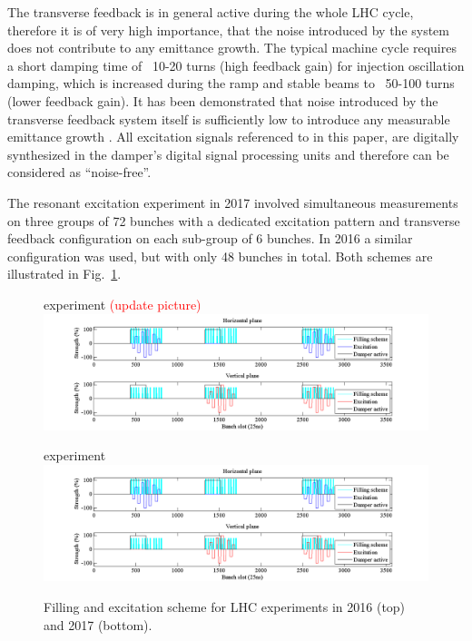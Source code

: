 \documentclass[%
 reprint,
 amsmath,amssymb,
 aps,
prstab,
]{revtex4-1}
\begin{document}
The transverse feedback is in general active during the whole LHC cycle, therefore it is of very high importance, that the noise introduced by the system does not contribute to any emittance growth. The typical machine cycle requires a short damping time of ~10-20 turns (high feedback gain) for injection oscillation damping, which is increased during the ramp and stable beams to ~50-100 turns (lower feedback gain). It has been demonstrated that noise introduced by the transverse feedback system itself is sufficiently low to introduce any measurable emittance growth \cite{adt_noise_emit_2017}. All excitation signals referenced to in this paper, are digitally synthesized in the damper's digital signal processing units and therefore can be considered as ``noise-free''.

The resonant excitation experiment in 2017 involved simultaneous measurements on three groups of 72 bunches with a dedicated excitation pattern and transverse feedback configuration on each sub-group of 6 bunches. In 2016 a similar configuration was used, but with only 48 bunches in total. Both schemes are illustrated in Fig.~\ref{fig:fill}.
\begin{figure}
	\begin{minipage}[t]{1.0\linewidth}
		 experiment \textcolor{red}{(update picture)}
		\includegraphics[width=1.0\linewidth]{bunchfilling.png}	
	\end{minipage}
	\begin{minipage}[t]{1.0\linewidth}
	 experiment
	\includegraphics[width=1.0\linewidth]{bunchfilling.png}	
	\end{minipage}
	\caption{\label{fig:fill} Filling and excitation scheme for LHC experiments in 2016 (top) and 2017 (bottom).}
\end{figure}
\end{document}
